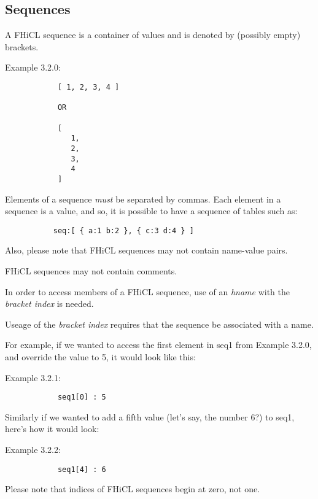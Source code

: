 \documentclass{article}
\begin{document}
	\subsection{Sequences}
		A FHiCL sequence is a container of values
		and is denoted by (possibly empty) brackets.
		\par
		Example 3.2.0:
		\begin{verbatim}
			[ 1, 2, 3, 4 ]
			
			OR

			[
			   1,
			   2,
			   3,
			   4
			]
		\end{verbatim}
		\par
		Elements of a sequence \emph{must} be separated by commas.
		Each element in a sequence is a value, and so,
		it is possible to have a sequence of tables such as:
		\begin{verbatim}
		   seq:[ { a:1 b:2 }, { c:3 d:4 } ]
		\end{verbatim}
		\par
		Also, please note that FHiCL sequences may not contain name-value pairs.
		\par
		FHiCL sequences may not contain comments.
		\par
		In order to access members of a FHiCL sequence, use of an \emph{hname}
		with the \emph{bracket index} is needed.
		\par
		Useage of the \emph{bracket index} requires that the sequence be associated with a name.
		\par
		For example, if we wanted to access the first element in seq1 from Example 3.2.0,
		and override the value to 5, it would look like this:
		\par
		Example 3.2.1:
		\begin{verbatim}
			seq1[0] : 5
		\end{verbatim}
		\par
		Similarly if we wanted to add a fifth value (let's say, the number 6?) to seq1,
		here's how it would look:
		\par
		Example 3.2.2:
		\begin{verbatim}
			seq1[4] : 6
		\end{verbatim}
		\par
		Please note that indices of FHiCL sequences begin at zero, not one.
\end{document}

